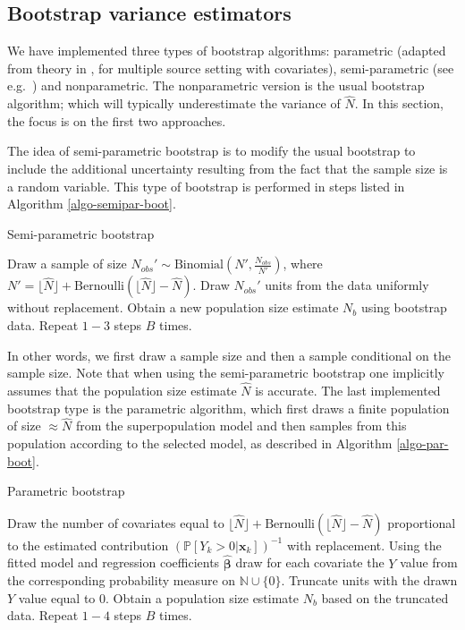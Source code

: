 \documentclass[
]{jss}
\newcommand{\1}{\mathcal{I}} \newcommand{\bZero}{\boldsymbol{0}}
\begin{document}
\subsection{Bootstrap variance estimators}\label{sec-boostrap}

We have implemented three types of bootstrap algorithms: parametric
(adapted from theory in \cite{zwane}, \cite{norrpoll} for multiple
source setting with covariates), semi-parametric (see
e.g.~\cite{BoehningFriedl2021}) and nonparametric. The nonparametric
version is the usual bootstrap algorithm; which will typically
underestimate the variance of \(\hat{N}\). In this section, the focus is
on the first two approaches.

The idea of semi-parametric bootstrap is to modify the usual bootstrap
to include the additional uncertainty resulting from the fact that the
sample size is a random variable. This type of bootstrap is performed in
steps listed in Algorithm \ref{algo-semipar-boot}.

\begin{algorithm}[ht!]
\small
\caption{Semi-parametric bootstrap}
\label{algo-semipar-boot}\DontPrintSemicolon
{} Draw a sample of size $N_{obs}'\sim\text{Binomial}\left(N', \frac{N_{obs}}{N'}\right)$, where $N'=\lfloor\hat{N}\rfloor+\text{Bernoulli}\left(\lfloor\hat{N}\rfloor-\hat{N}\right)$.\;
 Draw $N_{obs}'$ units from the data uniformly without replacement.\;
 Obtain a new population size estimate $N_b$ using bootstrap data.\;
 Repeat $1-3$ steps $B$ times.
\end{algorithm}

In other words, we first draw a sample size and then a sample
conditional on the sample size. Note that when using the semi-parametric
bootstrap one implicitly assumes that the population size estimate
\(\hat{N}\) is accurate. The last implemented bootstrap type is the
parametric algorithm, which first draws a finite population of size
\(\approx\hat{N}\) from the superpopulation model and then samples from
this population according to the selected model, as described in
Algorithm \ref{algo-par-boot}.

\begin{algorithm}[ht!]
\small
\caption{Parametric bootstrap}
\label{algo-par-boot}\DontPrintSemicolon
{} Draw the number of covariates equal to $\lfloor\hat{N}\rfloor+\text{Bernoulli}\left(\lfloor\hat{N}\rfloor-\hat{N}\right)$ proportional to the estimated contribution $(\mathbb{P}\left[Y_{k}>0|\boldsymbol{x}_{k}\right])^{-1}$ with replacement.\;
 Using the fitted model and regression coefficients $\hat{\boldsymbol{\beta}}$ draw for each covariate the $Y$ value from the corresponding probability measure on $\mathbb{N}\cup\{0\}$.\;
 Truncate units with the drawn $Y$ value equal to $0$.\;
 Obtain a population size estimate $N_b$ based on the truncated data.\;
 Repeat $1-4$ steps $B$ times.
\end{algorithm}
\end{document}
